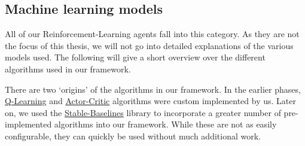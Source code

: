 \subsection*{Machine learning models}\label{subsec:MachineLearningModels}

All of our Reinforcement-Learning agents fall into this category. As they are not the focus of this thesis, we will not go into detailed explanations of the various models used. The following will give a short overview over the different algorithms used in our framework.

There are two `origins' of the algorithms in our framework. In the earlier phases, \hyperref[item:QLearning]{Q-Learning} and \hyperref[item:ActorCritic]{Actor-Critic} algorithms were custom implemented by us. Later on, we used the \hyperref[item:StableBaselines]{Stable-Baselines} library to incorporate a greater number of pre-implemented algorithms into our framework. While these are not as easily configurable, they can quickly be used without much additional work.

